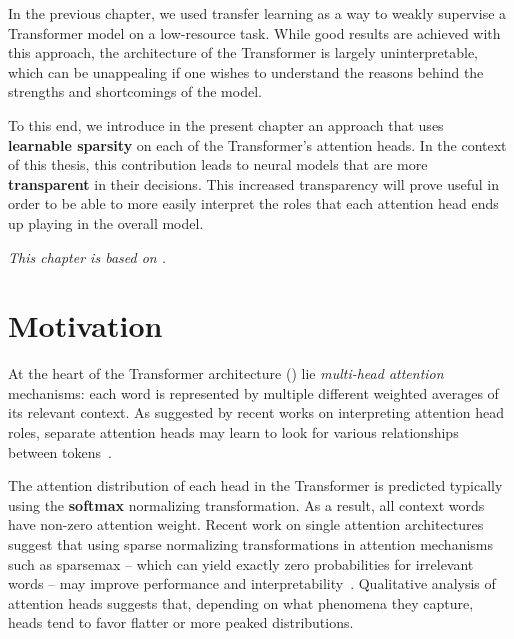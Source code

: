 \label{chap:adaptsparse}

\cleardoublepage
{}

In the previous chapter, we used transfer learning as a way
to weakly supervise a Transformer model on a low-resource task.
While good results are achieved with this approach, the
architecture of the Transformer is largely uninterpretable,
which can be unappealing if one wishes to understand the
reasons behind the strengths and shortcomings of the model.

To this end, we introduce in the present chapter an approach that
uses \textbf{learnable sparsity} on each of the Transformer's
attention heads. In the context of this thesis, this contribution
leads to neural models that are more \textbf{transparent} in their
decisions. This increased transparency will prove useful in order to
be able to more easily interpret the roles that each attention head
ends up playing in the overall model.

\textit{This chapter is based on \citet{correia2019adaptively}.}

\section{Motivation}

At the heart of the Transformer architecture
() lie \emph{multi-head attention}
mechanisms: each word is represented by multiple different weighted
averages of its relevant context. As suggested by recent works on
interpreting attention head roles, separate attention heads may learn
to look for various relationships between
tokens~\citep{tang2018why,raganato2018analysis,
    marecek-rosa-2018-extracting,bert-rediscovers,specialized}.

The attention distribution of each head in the Transformer is
predicted typically using the \textbf{softmax} normalizing transformation.
As a result, all context words have non-zero attention weight. Recent
work on single attention architectures suggest that using sparse
normalizing transformations in attention mechanisms such as sparsemax --
which can yield exactly zero probabilities for irrelevant words --
may improve performance and
interpretability~\citep{malaviya2018sparse,deng2018latent,entmax}.
Qualitative analysis of attention heads
\citep[Figure~5]{vaswani2017attention} suggests that, depending on
what phenomena they capture, heads tend to favor flatter or more
peaked distributions.

